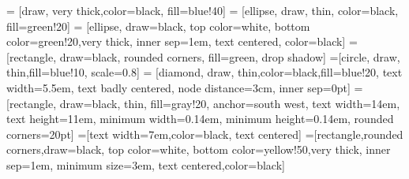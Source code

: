 
\usetikzlibrary{positioning,arrows,shapes,shadows}
 = [draw, very thick,color=black, fill=blue!40]
 = [ellipse, draw, thin, color=black, fill=green!20]
 = [ellipse, draw=black, top color=white, bottom color=green!20,very thick, inner sep=1em, text centered, color=black]
=[rectangle, draw=black, rounded corners, fill=green, drop shadow]
=[circle, draw, thin,fill=blue!10, scale=0.8]
 = [diamond, draw, thin,color=black,fill=blue!20,
    text width=5.5em, text badly centered, node distance=3cm, inner sep=0pt]
    =[rectangle, draw=black, thin, fill=gray!20,
                                 anchor=south west, text width=14em,
                                 text height=11em, minimum width=0.14em,
                                 minimum height=0.14em, rounded
                                 corners=20pt]
=[text width=7em,color=black, text centered]
=[rectangle,rounded corners,draw=black, top color=white, bottom color=yellow!50,very thick, inner sep=1em, minimum size=3em, text centered,color=black]
